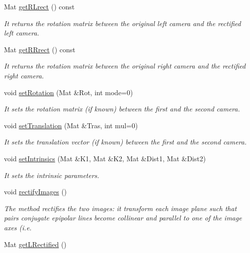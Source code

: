\begin{DoxyCompactItemize}
Mat \hyperlink{classStereoCamera_ae3421ead8d31c84c726a27e3b702d798}{get\+R\+Lrect} () const 
\begin{DoxyCompactList}\small\item\em It returns the rotation matrix between the original left camera and the rectified left camera. \end{DoxyCompactList}\item 
Mat \hyperlink{classStereoCamera_a41eb4d6884d233cf9b1a3cdc226f7028}{get\+R\+Rrect} () const 
\begin{DoxyCompactList}\small\item\em It returns the rotation matrix between the original right camera and the rectified right camera. \end{DoxyCompactList}\item 
void \hyperlink{classStereoCamera_a1329b3894d527e1505618f57a1304624}{set\+Rotation} (Mat \&Rot, int mode=0)
\begin{DoxyCompactList}\small\item\em It sets the rotation matrix (if known) between the first and the second camera. \end{DoxyCompactList}\item 
void \hyperlink{classStereoCamera_a7b10f1218e8e70f47b22080ba1820d39}{set\+Translation} (Mat \&Tras, int mul=0)
\begin{DoxyCompactList}\small\item\em It sets the translation vector (if known) between the first and the second camera. \end{DoxyCompactList}\item 
void \hyperlink{classStereoCamera_a54754623497c8dddb61f520e17f465f8}{set\+Intrinsics} (Mat \&K1, Mat \&K2, Mat \&Dist1, Mat \&Dist2)
\begin{DoxyCompactList}\small\item\em It sets the intrinsic parameters. \end{DoxyCompactList}\item 
void \hyperlink{classStereoCamera_ae5ac866c6d4b6c4819b01a918e7b61e0}{rectify\+Images} ()
\begin{DoxyCompactList}\small\item\em The method rectifies the two images\+: it transform each image plane such that pairs conjugate epipolar lines become collinear and parallel to one of the image axes (i.\+e. \end{DoxyCompactList}\item 
Mat \hyperlink{classStereoCamera_a0bd4492f7f87862955da0bc5d0042cc8}{get\+L\+Rectified} ()

\end{DoxyCompactItemize}
